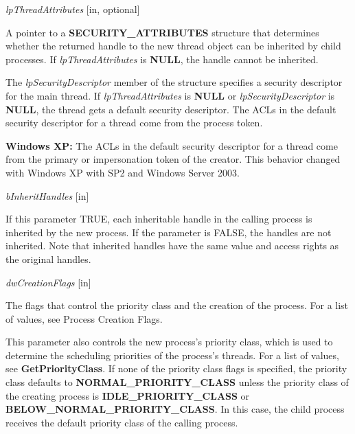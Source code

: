 \documentclass[a4paper]{book}
\newenvironment{customindent}[1]
{\begin{list}{}
	{\setlength{\leftmargin}{#1}}
    	\item[]
    }
{\end{list}}
\begin{document}
\noindent \textit{lpThreadAttributes} [in, optional]
\begin{customindent}{1cm}
    A pointer to a \textbf{SECURITY\_ATTRIBUTES} structure that determines whether the returned handle to the new thread object can be inherited by child processes. If \textit{lpThreadAttributes} is \textbf{NULL}, the handle cannot be inherited.

    The \textit{lpSecurityDescriptor} member of the structure specifies a security descriptor for the main thread. If \textit{lpThreadAttributes} is \textbf{NULL} or \textit{lpSecurityDescriptor} is \textbf{NULL}, the thread gets a default security descriptor. The ACLs in the default security descriptor for a thread come from the process token.

    \textbf{Windows XP:}  The ACLs in the default security descriptor for a thread come from the primary or impersonation token of the creator. This behavior changed with Windows XP with SP2 and Windows Server 2003.
\end{customindent}

\newpage
\noindent \textit{bInheritHandles} [in]
\begin{customindent}{1cm}
	If this parameter TRUE, each inheritable handle in the calling process is inherited by the new process. If the parameter is FALSE, the handles are not inherited. Note that inherited handles have the same value and access rights as the original handles.
\end{customindent}

\noindent \textit{dwCreationFlags} [in]
\begin{customindent}{1cm}
    The flags that control the priority class and the creation of the process. For a list of values, see Process Creation Flags.

    This parameter also controls the new process's priority class, which is used to determine the scheduling priorities of the process's threads. For a list of values, see \textbf{GetPriorityClass}. If none of the priority class flags is specified, the priority class defaults to \textbf{NORMAL\_PRIORITY\_CLASS} unless the priority class of the creating process is \newline\textbf{IDLE\_PRIORITY\_CLASS} or \newline\textbf{BELOW\_NORMAL\_PRIORITY\_CLASS}. In this case, the child process receives the default priority class of the calling process.
\end{customindent}
\end{document}
